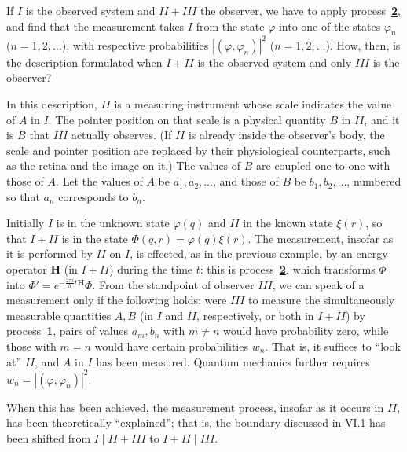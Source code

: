 \documentclass[fontsize=13pt,twoside,openany,headings=normal,parskip=false,bookmarkpackage=false,DIV=calc]{scrbook}
\begin{document}
If $I$ is the observed system and $II+III$ the observer, we have to apply process~\hyperref[eq:V.1.2]{\textbf{2}}, and find that the measurement takes $I$ from the state $\varphi$ into one of the states $\varphi_n$ ($n=1,2,\ldots$), with respective probabilities $|(\varphi,\varphi_n)|^2$ ($n=1,2,\ldots$). How, then, is the description formulated when $I+II$ is the observed system and only $III$ is the observer?

In this description, $II$ is a measuring instrument whose scale indicates the value of $A$ in $I$. The pointer position on that scale is a physical quantity $B$ in $II$, and it is $B$ that $III$ actually observes. (If $II$ is already inside the observer's body, the scale and pointer position are replaced by their physiological counterparts, such as the retina and the image on it.) The values of $B$ are coupled one-to-one with those of $A$. Let the values of $A$ be $a_1,a_2,\ldots$, and those of $B$ be $b_1,b_2,\ldots$, numbered so that $a_n$ corresponds to $b_n$.

Initially $I$ is in the unknown state $\varphi(q)$ and $II$ in the known state $\xi(r)$, so that $I+II$ is in the state $\Phi(q,r)=\varphi(q)\xi(r)$. The measurement, insofar as it is performed by $II$ on $I$, is effected, as in the previous example, by an energy operator $\boldsymbol H$ (in $I+II$) during the time $t$: this is process~\hyperref[eq:V.1.2]{\textbf{2}}, which transforms $\Phi$ into $\Phi'=e^{-\frac{2\pi i}{h}t\boldsymbol H}\Phi$. From the standpoint of observer $III$, we can speak of a measurement only if the following holds: were $III$ to measure the simultaneously measurable quantities $A,B$ (in $I$ and $II$, respectively, or both in $I+II$) by process~\hyperref[eq:V.1.1]{\textbf{1}}, pairs of values $a_m,b_n$ with $m\ne n$ would have probability zero, while those with $m=n$ would have certain probabilities $w_n$. That is, it suffices to ``look at'' $II$, and $A$ in $I$ has been measured. Quantum mechanics further requires $w_n=|(\varphi,\varphi_n)|^2$.

When this has been achieved, the measurement process, insofar as it occurs in $II$, has been theoretically ``explained''; that is, the boundary discussed in \hyperref[sec:VI.1]{VI.1} has been shifted from $I\mid II+III$ to $I+II\mid III$.
\end{document}
